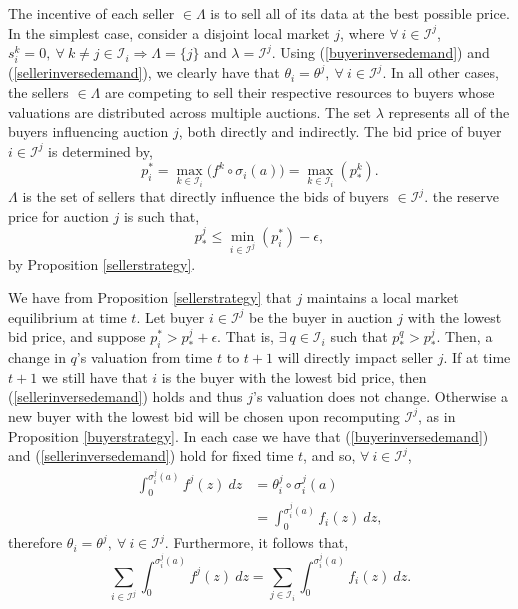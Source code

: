 \documentclass[12pt]{article}
\theoremstyle{definition}
\newcommand{\mcI}{\mathcal{I}}
\newcommand{\g}{\sigma}
\begin{document}
\begin{multicols}{2}
\iffalse
Now, we have,
\begin{equation}\label{rho}
    \rho^j(p_*^j) \le \displaystyle\sum_{i\in\mcI^j} e_i(a(s_i^j)),
\end{equation}
from (\ref{datademand}), (\ref{buyerinversedemand}),
(\ref{sellerinversedemand}), and so $p_i^j \ge p_{*}^j \ge p_i^k, \ \forall \ i \in
[p_i^j]_{i\in\mcI^j}$ and $\forall \ k \in [p_i^k]_{k\in\mcI_i}$
\fi

The incentive of each seller $\in\Lambda$ is to sell all of its data at the
best possible price. In the simplest case,
consider a disjoint local market $j$, where $\forall \ i\in\mcI^j$, $s_i^k = 0,
\ \forall \ k\ne j \in \mcI_i \Rightarrow \Lambda = \lbrace j \rbrace$ and
$\lambda = \mcI^j$. 
Using (\ref{buyerinversedemand}) and  (\ref{sellerinversedemand}), we clearly
have that $\theta_i = \theta^j, \ \forall \ i \in \mcI^j$.
In all other cases, the sellers $\in\Lambda$ are competing to sell
their respective resources to buyers whose valuations are distributed across multiple auctions. 
The set $\lambda$ represents all of the buyers influencing auction $j$, both
directly and indirectly. 
The bid price of buyer $i\in\mcI^j$ is determined by,
\begin{equation}\label{maxbid}
    p_i^* = \max_{k\in\mcI_i}\big(f^k \circ \g_i(a)\big)= \max_{k\in\mcI_i}(p_*^k).
\end{equation}
$\Lambda$ is the set of sellers that directly influence the bids of buyers
$\in\mcI^j$. the reserve price for auction $j$ is such that,
\begin{equation}\label{resprice}
    p_*^j \le \min_{i\in\mcI^j}(p_i^*) - \epsilon,
\end{equation}
by Proposition \ref{sellerstrategy}. 

We have from Proposition \ref{sellerstrategy} that $j$ maintains a local market
equilibrium at time $t$. Let buyer $i\in\mcI^j$ be the buyer in auction $j$ with the lowest bid price,
and suppose $p_i^* > p_*^j + \epsilon$. That is, $\exists \ q \in \mcI_i$ such
that $p_*^q > p_*^j$. Then, a change in $q$'s valuation from time $t$ to $t+1$ will
directly impact seller $j$. If at time $t+1$ we still have that $i$ is the
buyer with the lowest bid price, then (\ref{sellerinversedemand}) holds and
thus $j$'s valuation does not change. Otherwise a new buyer with the lowest bid will be chosen upon
recomputing $\mcI^j$, as in Proposition \ref{buyerstrategy}. 
In each case we
have that (\ref{buyerinversedemand}) and (\ref{sellerinversedemand}) hold for
fixed time $t$, and so, $\forall \ i \in\mcI^j$,
\begin{align*}
    \int_0^{\g_i^j(a)} f^j(z) \ dz &= \theta_i^j \circ \g_i^j(a)\\
    &= \int_0^{\g_i^j(a)} f_i(z) \ dz,
\end{align*}
therefore $\theta_i = \theta^j, \ \forall \ i \in \mcI^j$.
Furthermore, it follows that,
\begin{equation}\label{jdemand}
    \displaystyle\sum_{i\in\mcI^j}\int_0^{\g_i^j(a)} f^j(z) \ dz =
\sum_{j\in\mcI_i}\int_0^{\g_i^j(a)} f_i(z) \ dz.
\end{equation}


\end{multicols}
\end{document}
